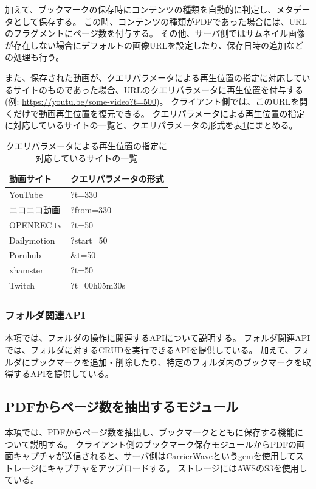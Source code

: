 加えて、ブックマークの保存時にコンテンツの種類を自動的に判定し、メタデータとして保存する。
この時、コンテンツの種類がPDFであった場合には、URLのフラグメントにページ数を付与する。
その他、サーバ側ではサムネイル画像が存在しない場合にデフォルトの画像URLを設定したり、保存日時の追加などの処理も行う。

また、保存された動画が、クエリパラメータによる再生位置の指定に対応しているサイトのものであった場合、URLのクエリパラメータに再生位置を付与する(例: \url{https://youtu.be/some-video?t=500})。
クライアント側では、このURLを開くだけで動画再生位置を復元できる。
クエリパラメータによる再生位置の指定に対応しているサイトの一覧と、クエリパラメータの形式を表\ref{tb:impl-server-video-query-params}にまとめる。

\begin{table}[htbp]
  \label{tb:impl-server-video-query-params}
  \caption{クエリパラメータによる再生位置の指定に対応しているサイトの一覧}
  \begin{center}
    \begin{tabular}{|l|l|}
    \hline
    動画サイト & クエリパラメータの形式 \\ \hline \hline
    YouTube & ?t=330 \\ \hline
    ニコニコ動画 & ?from=330 \\ \hline
    OPENREC.tv & ?t=50 \\ \hline
    Dailymotion & ?start=50 \\ \hline
    Pornhub & \&t=50 \\ \hline
    xhamster & ?t=50 \\ \hline
    Twitch & ?t=00h05m30s \\ \hline
    \end{tabular}
  \end{center}
\end{table}

\subsubsection{フォルダ関連API}
本項では、フォルダの操作に関連するAPIについて説明する。
フォルダ関連APIでは、フォルダに対するCRUDを実行できるAPIを提供している。
加えて、フォルダにブックマークを追加・削除したり、特定のフォルダ内のブックマークを取得するAPIを提供している。

\subsection{PDFからページ数を抽出するモジュール}
本項では、PDFからページ数を抽出し、ブックマークとともに保存する機能について説明する。
クライアント側のブックマーク保存モジュールからPDFの画面キャプチャが送信されると、サーバ側はCarrierWave\cite{carrier-wave}というgemを使用してストレージにキャプチャをアップロードする。
ストレージにはAWSのS3\cite{s3}を使用している。

